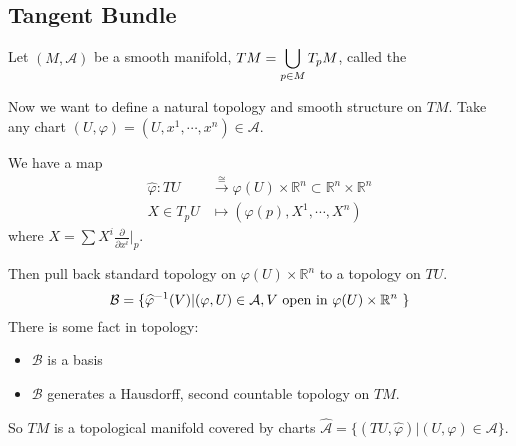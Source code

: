 \subsection{Tangent Bundle}
 Let  $ (M,\mathcal{A}) $ be a smooth manifold,  $ TM=\dps\bigcup_{p\in M}T_pM $, called the 
 
 Now we want to define a natural topology and smooth structure on  $ TM $. Take any chart  $ (U,\varphi)=(U,x^1,\cdots,x^n)\in \mathcal{A} $.
 
 We have a map 
\begin{align*}
    \hat{\varphi}:TU&\xrightarrow{\cong}\varphi(U)\times\mathbb{R}^n\subset \mathbb{R}^n\times\mathbb{R}^n\\
    X\in T_pU&\mapsto (\varphi(p),X^1,\cdots,X^n)
\end{align*}  
 where  $ X=\sum X^i\frac{\partial}{\partial x^i}|_p $.
 
 Then pull back standard topology on  $ \varphi(U)\times\mathbb{R}^n $ to a topology on  $ TU $.
 \[\mathcal{B}=\{\hat{\varphi}^{-1}(V)|(\varphi,U)\in \mathcal{A},  V \text{ open in  $ \varphi(U)\times\mathbb{R}^n $ }\}\]
 There is some fact in topology:
\begin{itemize}
    \item  $ \mathcal{B} $ is a basis
    \item  $ \mathcal{B} $ generates a Hausdorff, second countable topology on  $ TM $. 
\end{itemize} 
 So  $ TM  $ is a topological manifold covered by charts  $ \hat{\mathcal{A}}=\{(TU,\hat{\varphi})|(U,\varphi)\in\mathcal{A}\} $.
 
